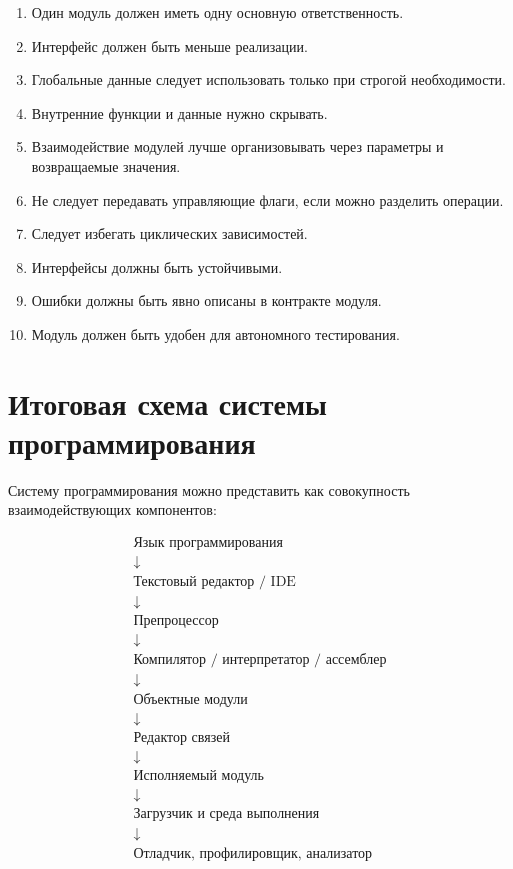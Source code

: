 \documentclass[12pt,a4paper]{article}
\begin{document}
\begin{enumerate}
  \item Один модуль должен иметь одну основную ответственность.
  \item Интерфейс должен быть меньше реализации.
  \item Глобальные данные следует использовать только при строгой необходимости.
  \item Внутренние функции и данные нужно скрывать.
  \item Взаимодействие модулей лучше организовывать через параметры и возвращаемые значения.
  \item Не следует передавать управляющие флаги, если можно разделить операции.
  \item Следует избегать циклических зависимостей.
  \item Интерфейсы должны быть устойчивыми.
  \item Ошибки должны быть явно описаны в контракте модуля.
  \item Модуль должен быть удобен для автономного тестирования.
\end{enumerate}

\section{Итоговая схема системы программирования}

Систему программирования можно представить как совокупность взаимодействующих компонентов:

\[
\begin{array}{c}
\text{Язык программирования} \\
\downarrow \\
\text{Текстовый редактор / IDE} \\
\downarrow \\
\text{Препроцессор} \\
\downarrow \\
\text{Компилятор / интерпретатор / ассемблер} \\
\downarrow \\
\text{Объектные модули} \\
\downarrow \\
\text{Редактор связей} \\
\downarrow \\
\text{Исполняемый модуль} \\
\downarrow \\
\text{Загрузчик и среда выполнения} \\
\downarrow \\
\text{Отладчик, профилировщик, анализатор}
\end{array}
\]
\end{document}
